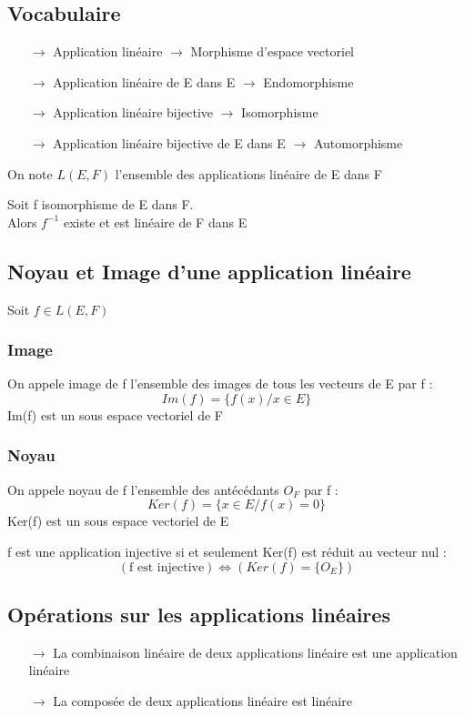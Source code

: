 \subsection{Vocabulaire}
\begin{itemize}
 \item[$\rightarrow$] Application linéaire $\rightarrow$ Morphisme d'espace vectoriel
 \item[$\rightarrow$] Application linéaire de E dans E $\rightarrow$ Endomorphisme
 \item[$\rightarrow$] Application linéaire bijective $\rightarrow$ Isomorphisme
 \item[$\rightarrow$] Application linéaire bijective de E dans E $\rightarrow$ Automorphisme
\end{itemize}
On note $L(E,F)$ l'ensemble des applications linéaire de E dans F
\begin{prop}
Soit f isomorphisme de E dans F.\\
Alors $f^{-1}$ existe et est linéaire de F dans E
\end{prop}

\subsection{Noyau et Image d'une application linéaire}
Soit $f \in L(E,F)$
\subsubsection{Image}
\begin{de}
On appele image de f l'ensemble des images de tous les vecteurs de E par f :
$$Im(f) = \{f(x) / x\in E \}$$
Im(f) est un sous espace vectoriel de F
\end{de}
\subsubsection{Noyau}
\begin{de}
On appele noyau de f l'ensemble des antécédants $O_F$ par f :
$$Ker(f) = \{ x \in E / f(x) = 0 \}$$
Ker(f) est un sous espace vectoriel de E
\end{de}
\begin{prop}
f est une application injective si et seulement Ker(f) est réduit au vecteur nul :
$$(\mbox{f est injective}) \Leftrightarrow (Ker(f) = \{O_E\})$$
\end{prop}
\subsection{Opérations sur les applications linéaires}
\begin{itemize}
 \item[$\rightarrow$] La combinaison linéaire de deux applications linéaire est une application linéaire
 \item[$\rightarrow$] La composée de deux applications linéaire est linéaire
\end{itemize}

